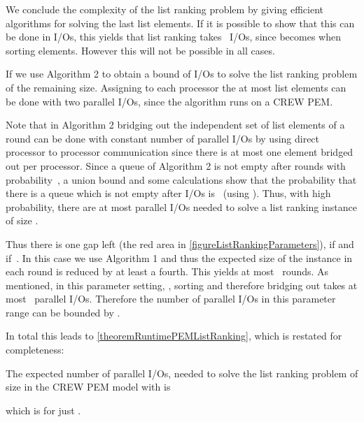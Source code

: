\documentclass[envcountsame]{llncs}
\def\bO#1{\printmath{\mathcal{O}\left(#1\right)}}
\begin{document}
We conclude the complexity of the list ranking problem by giving efficient algorithms for solving the last \smallInstanceSize list elements. 
If it is possible to show that this can be done in \bO{\log P} I/Os, this yields that list ranking takes ~I/Os, since  becomes \bO{\log P} when sorting  elements.
However this will not be possible in all cases.

If  we use Algorithm 2 to obtain a bound of \bO{\log P} I/Os to solve the list ranking problem of the remaining size. 
Assigning to each processor the at most  list elements can be done with two parallel I/Os, since the algorithm runs on a CREW PEM.


Note that in Algorithm 2 bridging out the independent set  of list elements of a round can be done with constant number of parallel I/Os by using direct processor to processor communication since there is at most one element bridged out per processor.
Since a queue of Algorithm 2 is not empty after \bO{\log P} rounds with probability~, a union bound and some calculations show that the probability that there is a queue which is not empty after \bO{\log P} I/Os is~ (using ).
Thus, with high probability, there are at most \bO{\log(P)} parallel I/Os needed to solve a list ranking instance of size \smallInstanceSize.


Thus there is one gap left (the red area in \autoref{figureListRankingParameters}), if  and if~.
In this case we use Algorithm 1 and thus the expected size of the instance in each round is reduced by at least a fourth.
This yields at most~ rounds.
As mentioned, in this parameter setting, , sorting and therefore bridging out takes at most~\bO{\log P} parallel I/Os.
Therefore the number of parallel I/Os in this parameter range can be bounded by \bO{(\log\frac{B}{\log P})(\log P)}.

In total this leads to \autoref{theoremRuntimePEMListRanking}, which is restated for completeness:

\begin{theorem}
\label{theoremRuntimePEMListRankingRestated}
The expected number of parallel I/Os, needed to solve the list ranking problem of size  in the CREW PEM model with  is 

which is for  just . 
\end{theorem}
\end{document}

